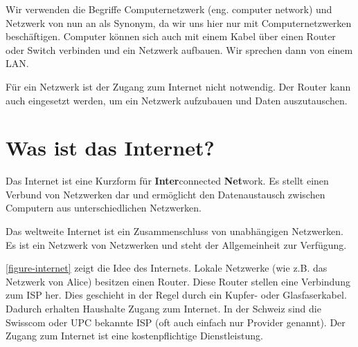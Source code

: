 Wir verwenden die Begriffe Computernetzwerk (eng. computer network) und Netzwerk von nun an als Synonym, da wir uns hier nur mit Computernetzwerken beschäftigen. Computer können sich auch mit einem Kabel über einen Router oder Switch verbinden und ein Netzwerk aufbauen. Wir sprechen dann von einem \ac{LAN}.

\begin{important}
  Für ein Netzwerk ist der Zugang zum Internet nicht notwendig. Der Router kann auch  eingesetzt werden, um ein Netzwerk aufzubauen und Daten auszutauschen.
\end{important}

\section{Was ist das Internet?}


Das Internet ist eine Kurzform für \textbf{Inter}connected \textbf{Net}work. Es stellt einen Verbund von Netzwerken dar und ermöglicht den Datenaustausch zwischen Computern aus unterschiedlichen Netzwerken.

\begin{definition}[Internet]
Das weltweite Internet ist ein Zusammenschluss von unabhängigen Netzwerken. Es ist ein Netzwerk von Netzwerken und steht der Allgemeinheit zur Verfügung.
\end{definition}

\autoref{figure-internet} zeigt die Idee des Internets. Lokale Netzwerke (wie z.B. das Netzwerk von Alice) besitzen einen Router. Diese Router stellen eine Verbindung zum \ac{ISP} her. Dies geschieht in der Regel durch ein Kupfer- oder Glasfaserkabel. Dadurch erhalten Haushalte Zugang zum Internet. In der Schweiz sind die Swisscom oder UPC bekannte \ac{ISP} (oft auch einfach nur Provider genannt). Der Zugang zum Internet ist eine kostenpflichtige Dienstleistung.

